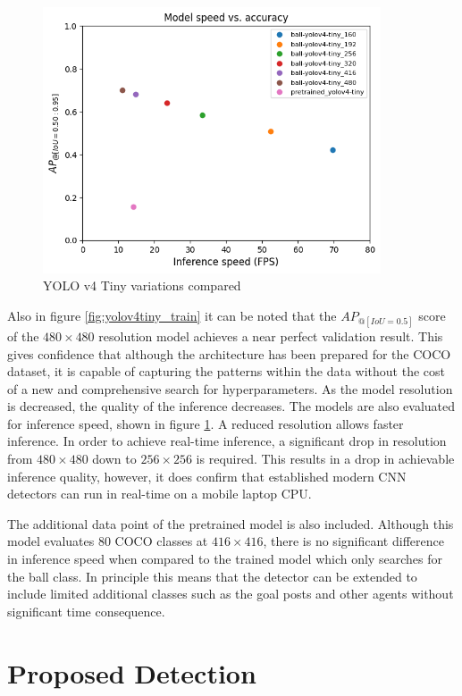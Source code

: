 \documentclass[a4paper,twoside,12pt]{report}
\begin{document}
\begin{figure}[h!]
\begin{center}
\includegraphics[width=10cm]{images/yolov4tiny_compare.png}
\caption{YOLO v4 Tiny variations compared}
\label{fig:yolov4tiny_compare}
\end{center}
\end{figure}

Also in figure \ref{fig:yolov4tiny_train} it can be noted that the $AP_{@[IoU=0.5]}$ score of the $480 \times 480$ resolution model achieves a near perfect validation result. This gives confidence that although the architecture has been prepared for the COCO dataset, it is capable of capturing the patterns within the data without the cost of a new and comprehensive search for hyperparameters. As the model resolution is decreased, the quality of the inference decreases. The models are also evaluated for inference speed, shown in figure \ref{fig:yolov4tiny_compare}. A reduced resolution allows faster inference. In order to achieve real-time inference, a significant drop in resolution from $480 \times 480$ down to $256 \times 256$ is required. This results in a drop in achievable inference quality, however, it does confirm that established modern CNN detectors can run in real-time on a mobile laptop CPU. 

The additional data point of the pretrained model is also included. Although this model evaluates 80 COCO classes at $416 \times 416$, there is no significant difference in inference speed when compared to the trained model which only searches for the ball class. In principle this means that the detector can be extended to include limited additional classes such as the goal posts and other agents without significant time consequence.
\vfill

\pagebreak
\section{Proposed Detection}
\end{document}
